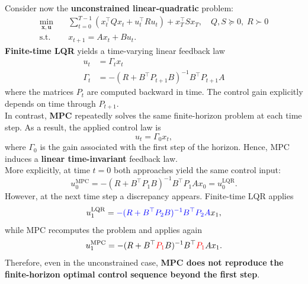 Consider now the \textbf{unconstrained linear-quadratic} problem:
\begin{align*}
\min_{\mathbf{x},\mathbf{u}} \quad & \sum_{t=0}^{T-1} \left( x_t^\top Q x_t + u_t^\top R u_t \right) + x_T^\top S x_T, \quad Q,S \succeq 0,\; R \succ 0 \\
\text{s.t.} \quad & x_{t+1} = A x_t + B u_t.
\end{align*}
\textbf{Finite-time LQR} yields a time-varying linear feedback law
\begin{align*}
    u_t &= \Gamma_t x_t\\
    \Gamma_t &= -(R + B^\top P_{t+1} B)^{-1} B^\top P_{t+1} A
\end{align*}
where the matrices $P_t$ are computed backward in time. The control gain explicitly depends on time through $P_{t+1}$.\\
In contrast, \textbf{MPC} repeatedly solves the same finite-horizon problem at each time step. As a result, the applied control law is
\[
u_t = \Gamma_0 x_t,
\]
where $\Gamma_0$ is the gain associated with the first step of the horizon. Hence, MPC induces a \textbf{linear time-invariant} feedback law.\\
More explicitly, at time $t=0$ both approaches yield the same control input:
\[
u_0^{\text{MPC}} = -(R + B^\top P_1 B)^{-1} B^\top P_1 A x_0 = u_0^{\text{LQR}}.
\]
However, at the next time step a discrepancy appears. Finite-time LQR applies
\[
u_1^{\text{LQR}} = \textcolor{blue}{-(R + B^\top P_2 B)^{-1} B^\top P_2 A} x_1,
\]
while MPC recomputes the problem and applies again
\[
u_1^{\text{MPC}} = {-(R + B^\top \textcolor{red}{P_1} B)^{-1} B^\top \textcolor{red}{P_1} A} x_1.
\]
Therefore, even in the unconstrained case, \textbf{MPC does not reproduce the finite-horizon optimal control sequence beyond the first step}.

